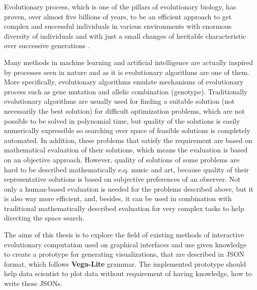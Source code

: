 \label{Introduction}
Evolutionary process, which is one of the pillars of evolutionary biology, has proven, over almost five billions of years, to be an efficient approach to get complex and successful individuals in various environments with enormous diversity of individuals and with just a small changes of heritable characteristic over successive generations \cite{on-the-origin-of-species}.

Many methods in machine learning and artificial intelligence are actually inspired by processes seen in nature \cite{introduction-to-evolutionary-computing} and as it is evolutionary algorithms are one of them. More specifically, evolutionary algorithms emulate mechanisms of evolutionary process such as gene mutation and allelic combination (genotype). Traditionally evolutionary algorithms are usually used for finding a suitable solution (not necessarily the best solution) for difficult optimization problems, which are not possible to be solved in polynomial time, but quality of the solutions is easily numerically expressible so searching over space of feasible solutions is completely automated. In addition, these problems that satisfy the requirement are based on mathematical evaluation of their solutions, which means the evaluation is based on an objective approach. However, quality of solutions of some problems are hard to be described mathematically e.q. music and art, because quality of their representative solutions is based on subjective preferences of an observer. Not only a human-based evaluation is needed for the problems described above, but it is also way more efficient, and, besides, it can be used in combination with traditional mathematically described evaluation for very complex tasks to help directing the space search.

The aims of this thesis is to explore the field of existing methods of interactive evolutionary computation used on graphical interfaces and use given knowledge to create a prototype for generating visualizations, that are described in JSON format, which follows \textbf{Vega-Lite} \cite{vega} grammar. The implemented prototype should help data scientist to plot data without requirement of having knowledge, how to write these JSONs.
